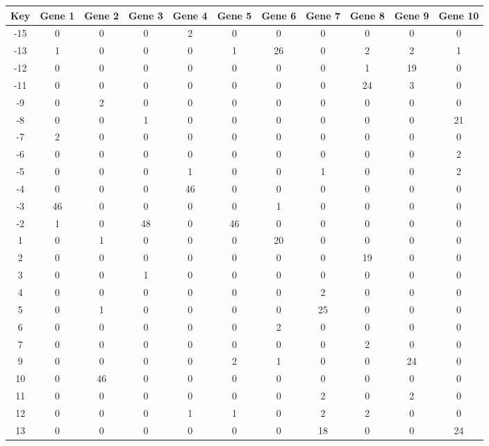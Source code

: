 \begin{tabular}{|c|c|c|c|c|c|c|c|c|c|c|}
\hline
Key & Gene 1 & Gene 2 & Gene 3 & Gene 4 & Gene 5 & Gene 6 & Gene 7 & Gene 8 & Gene 9 & Gene 10 \\
\hline
-15 & 0 & 0 & 0 & 2 & 0 & 0 & 0 & 0 & 0 & 0 \\
-13 & 1 & 0 & 0 & 0 & 1 & 26 & 0 & 2 & 2 & 1 \\
-12 & 0 & 0 & 0 & 0 & 0 & 0 & 0 & 1 & 19 & 0 \\
-11 & 0 & 0 & 0 & 0 & 0 & 0 & 0 & 24 & 3 & 0 \\
-9 & 0 & 2 & 0 & 0 & 0 & 0 & 0 & 0 & 0 & 0 \\
-8 & 0 & 0 & 1 & 0 & 0 & 0 & 0 & 0 & 0 & 21 \\
-7 & 2 & 0 & 0 & 0 & 0 & 0 & 0 & 0 & 0 & 0 \\
-6 & 0 & 0 & 0 & 0 & 0 & 0 & 0 & 0 & 0 & 2 \\
-5 & 0 & 0 & 0 & 1 & 0 & 0 & 1 & 0 & 0 & 2 \\
-4 & 0 & 0 & 0 & 46 & 0 & 0 & 0 & 0 & 0 & 0 \\
-3 & 46 & 0 & 0 & 0 & 0 & 1 & 0 & 0 & 0 & 0 \\
-2 & 1 & 0 & 48 & 0 & 46 & 0 & 0 & 0 & 0 & 0 \\
1 & 0 & 1 & 0 & 0 & 0 & 20 & 0 & 0 & 0 & 0 \\
2 & 0 & 0 & 0 & 0 & 0 & 0 & 0 & 19 & 0 & 0 \\
3 & 0 & 0 & 1 & 0 & 0 & 0 & 0 & 0 & 0 & 0 \\
4 & 0 & 0 & 0 & 0 & 0 & 0 & 2 & 0 & 0 & 0 \\
5 & 0 & 1 & 0 & 0 & 0 & 0 & 25 & 0 & 0 & 0 \\
6 & 0 & 0 & 0 & 0 & 0 & 2 & 0 & 0 & 0 & 0 \\
7 & 0 & 0 & 0 & 0 & 0 & 0 & 0 & 2 & 0 & 0 \\
9 & 0 & 0 & 0 & 0 & 2 & 1 & 0 & 0 & 24 & 0 \\
10 & 0 & 46 & 0 & 0 & 0 & 0 & 0 & 0 & 0 & 0 \\
11 & 0 & 0 & 0 & 0 & 0 & 0 & 2 & 0 & 2 & 0 \\
12 & 0 & 0 & 0 & 1 & 1 & 0 & 2 & 2 & 0 & 0 \\
13 & 0 & 0 & 0 & 0 & 0 & 0 & 18 & 0 & 0 & 24 \\
\hline
\end{tabular}